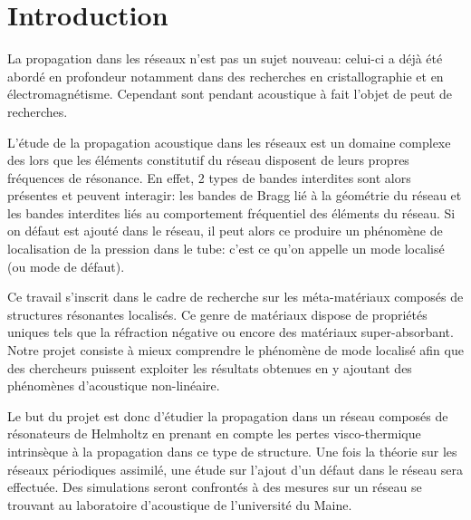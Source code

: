 \chapter{Introduction}


La propagation dans les réseaux n'est pas un sujet nouveau: celui-ci a déjà été abordé en profondeur notamment dans des recherches en cristallographie et en électromagnétisme. Cependant sont pendant acoustique à fait l'objet de peut de recherches.

L'étude de la propagation acoustique dans les réseaux est un domaine complexe des lors que les éléments constitutif du réseau disposent de leurs propres fréquences de résonance. En effet, 2 types de bandes interdites sont alors présentes et peuvent interagir: les bandes de Bragg lié à la géométrie du réseau et les bandes interdites liés au comportement fréquentiel des éléments du réseau. Si on défaut est ajouté dans le réseau, il peut alors ce produire un phénomène de localisation de la pression dans le tube: c'est ce qu'on appelle un mode localisé (ou mode de défaut).

Ce travail s'inscrit dans le cadre de recherche sur les méta-matériaux composés de structures résonantes localisés. Ce genre de matériaux dispose de propriétés uniques tels que la réfraction négative ou encore des matériaux super-absorbant. Notre projet consiste à mieux comprendre le phénomène de mode localisé afin que des chercheurs puissent exploiter les résultats obtenues en y ajoutant des phénomènes d'acoustique non-linéaire.

\bigskip
Le but du projet est donc d'étudier la propagation dans un réseau composés de résonateurs de Helmholtz en prenant en compte les pertes visco-thermique intrinsèque à la propagation dans ce type de structure. Une fois la théorie sur les réseaux périodiques assimilé, une étude sur l'ajout d'un défaut dans le réseau sera effectuée. Des simulations seront confrontés à des mesures sur un réseau se trouvant au laboratoire d'acoustique de l'université du Maine.

%
